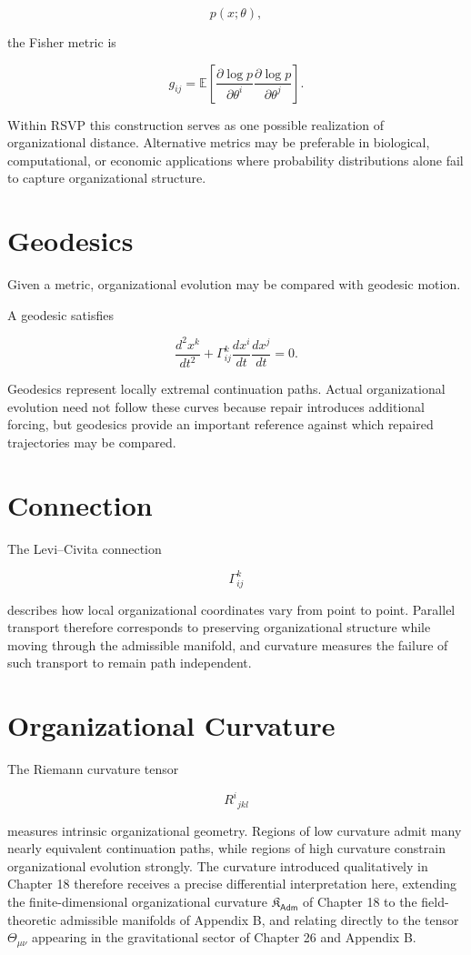 \documentclass[11pt,oneside]{book}
\numberwithin{equation}{chapter}
\theoremstyle{definition}
\theoremstyle{plain}
\newcommand{\Adm}{\mathsf{Adm}}
\begin{document}
\[
p(x;\theta),
\]

the Fisher metric is

\[
g_{ij}
=
\mathbb E
\left[
\frac{\partial\log p}
{\partial\theta^i}
\frac{\partial\log p}
{\partial\theta^j}
\right].
\]

Within RSVP this construction serves as one possible realization of organizational distance. Alternative metrics may be preferable in biological, computational, or economic applications where probability distributions alone fail to capture organizational structure.

\section{Geodesics}

Given a metric, organizational evolution may be compared with geodesic
motion.

A geodesic satisfies

\[
\frac{d^2x^k}{dt^2}
+
\Gamma^k_{ij}
\frac{dx^i}{dt}
\frac{dx^j}{dt}
=
0.
\]

Geodesics represent locally extremal continuation paths. Actual organizational evolution need not follow these curves because repair introduces additional forcing, but geodesics provide an important reference against which repaired trajectories may be compared.

\section{Connection}

The Levi--Civita connection

\[
\Gamma^k_{ij}
\]

describes how local organizational coordinates vary from point to point. Parallel transport therefore corresponds to preserving organizational structure while moving through the admissible manifold, and curvature measures the failure of such transport to remain path independent.

\section{Organizational Curvature}

The Riemann curvature tensor

\[
R^i{}_{jkl}
\]

measures intrinsic organizational geometry. Regions of low curvature admit many nearly equivalent continuation paths, while regions of high curvature constrain organizational evolution strongly. The curvature introduced qualitatively in Chapter 18 therefore receives a precise differential interpretation here, extending the finite-dimensional organizational curvature \(\mathfrak K_\Adm\) of Chapter 18 to the field-theoretic admissible manifolds of Appendix B, and relating directly to the tensor \(\Theta_{\mu\nu}\) appearing in the gravitational sector of Chapter 26 and Appendix B.
\end{document}
